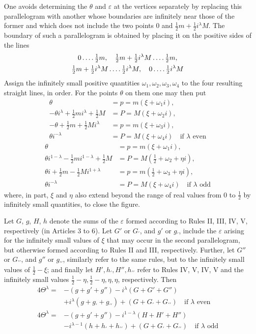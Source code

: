 One avoids determining the $\theta$ and $\varepsilon$ at the vertices separately by replacing this parallelogram with another whose boundaries are infinitely near those of the former
and which does not include the two points $0$ and $\tfrac12m+\tfrac12i^\lambda M$. The boundary of such a parallelogram is obtained by placing it on the positive sides of the lines
\[
\begin{gathered}
0\mathinner{.\,.\,.\,.}\tfrac12m,\quad\tfrac12m+\tfrac12i^\lambda M\mathinner{.\,.\,.\,.}\tfrac12m,\\
\tfrac12m+\tfrac12i^\lambda M\mathinner{.\,.\,.\,.}\tfrac12i^\lambda M,\quad 0\mathinner{.\,.\,.\,.}\tfrac12i^\lambda M
\end{gathered}
\]
Assign the infinitely small positive quantities $\omega_1,\omega_2,\omega_3,\omega_4$ to the four resulting straight lines, in order. For the points $\theta$ on them one may then put
\[
\begin{aligned}
\theta&=p=m(\xi+\omega_1i),\\
-\theta i^\lambda+\tfrac12mi^\lambda+\tfrac12M&=P=M(\xi+\omega_2i),\\
-\theta+\tfrac12m+\tfrac12Mi^\lambda&=p=m(\xi+\omega_3i),\\
\theta i^{-\lambda}&=P=M(\xi+\omega_4i)\quad\text{if }\lambda\text{ even}
\end{aligned}
\]
\[
\begin{aligned}
\theta&=p=m(\xi+\omega_1i),\\
\theta i^{1-\lambda}-\tfrac12mi^{1-\lambda}+\tfrac12M&=P=M(\tfrac12+\omega_2+\eta i),\\
\theta i+\tfrac12m-\tfrac12Mi^{1+\lambda}&=p=m(\tfrac12+\omega_3+\eta i),\\
\theta i^{-\lambda}&=P=M(\xi+\omega_4i)\quad\text{if }\lambda\text{ odd}
\end{aligned}
\]
where, in part, $\xi$ and $\eta$ also extend beyond the range of real values from $0$ to $\tfrac12$ by infinitely small quantities, to close the figure.

Let $G$, $g$, $H$, $h$ denote the sums of the $\varepsilon$ formed according to Rules II, III, IV, V, respectively (in Articles $3$ to $6$). Let $G'$ or $G_{\prime}$, and $g'$ or $g_{\prime}$, include the $\varepsilon$ arising for the infinitely small values of $\xi$ that may occur in the second parallelogram, but otherwise formed according to Rules II and III, respectively. Further, let $G''$ or $G_{\prime\prime}$, and $g''$ or $g_{\prime\prime}$, similarly refer to the same rules, but to the infinitely small values of $\tfrac12-\xi$; and finally let $H',h_{\prime},H'',h_{\prime\prime}$ refer to Rules IV, V, IV, V and the infinitely small values $\tfrac12-\eta,\tfrac12-\eta,\eta,\eta$, respectively. Then
\[
\begin{aligned}
4\Theta^\lambda={}&-(g+g'+g'')-i^\lambda(G+G'+G'')\\
&+i^\lambda(g+g_{\prime}+g_{\prime\prime})+(G+G_{\prime}+G_{\prime\prime})\quad\text{if }\lambda\text{ even}\\
4\Theta^\lambda={}&-(g+g'+g'')-i^{1-\lambda}(H+H'+H'')\\
&-i^{\lambda-1}(h+h_{\prime}+h_{\prime\prime})+(G+G_{\prime}+G_{\prime\prime})\quad\text{if }\lambda\text{ odd}
\end{aligned}
\]

